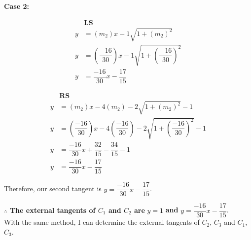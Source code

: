 \documentclass[12pt]{book}
\begin{document}
\begin{enumerate}
\textbf{Case 2:}\\
\begingroup
\addtolength{\jot}{0.8em}
\begin{minipage}{0.5\textwidth}
    \begin{align*}
    &\textbf{LS}\\
        y &= (m_2)x - 1\sqrt{1+(m_2)^2} \\
        y &= \left(\dfrac{-16}{30}\right)x - 1\sqrt{1+\left(\dfrac{-16}{30}\right)^2} \\
        y &= \dfrac{-16}{30}x - \dfrac{17}{15}
    \end{align*}
\end{minipage}
\endgroup
\begingroup
\addtolength{\jot}{0.3em}
\begin{minipage}{0.5\textwidth}
    \begin{align*}
    &\textbf{RS}\\
        y &= (m_2)x-4(m_2) - 2\sqrt{1+(m_2)^2}-1 \\
        y &= \left(\dfrac{-16}{30}\right)x-4\left(\dfrac{-16}{30}\right) - 2\sqrt{1+\left(\dfrac{-16}{30}\right)^2}-1 \\
        y &= \dfrac{-16}{30}x + \dfrac{32}{15} - \dfrac{34}{15} - 1\\
        y &= \dfrac{-16}{30}x - \dfrac{17}{15}
    \end{align*}
\end{minipage}
\endgroup

Therefore, our second tangent is $y = \dfrac{-16}{30}x - \dfrac{17}{15}$.

$\therefore$ \textbf{The external tangents of $C_1$ and $C_2$ are } $y = 1$ \textbf{and} $y=\dfrac{-16}{30}x - \dfrac{17}{15}$.\\

With the same method, I can determine the external tangents of $C_2$, $C_3$ and $C_1$, $C_3$.\\



\end{enumerate}
\end{document}
